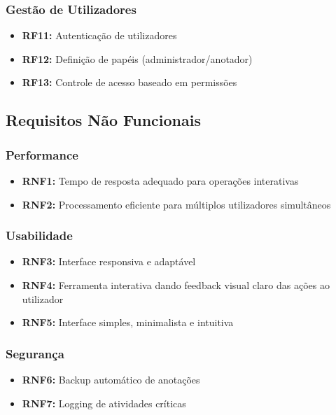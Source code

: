 \subsubsection{Gestão de Utilizadores}

\begin{itemize}
    \item \textbf{RF11:} Autenticação de utilizadores
    \item \textbf{RF12:} Definição de papéis (administrador/anotador)
    \item \textbf{RF13:} Controle de acesso baseado em permissões
\end{itemize}

\subsection{Requisitos Não Funcionais}

\subsubsection{Performance}

\begin{itemize}
    \item \textbf{RNF1:} Tempo de resposta adequado para operações interativas
    \item \textbf{RNF2:} Processamento eficiente para múltiplos utilizadores simultâneos
\end{itemize}

\subsubsection{Usabilidade}

\begin{itemize}
    \item \textbf{RNF3:} Interface responsiva e adaptável
    \item \textbf{RNF4:} Ferramenta interativa dando feedback visual claro das ações ao utilizador
    \item \textbf{RNF5:} Interface simples, minimalista e intuitiva
\end{itemize}

\subsubsection{Segurança}

\begin{itemize}
    \item \textbf{RNF6:} Backup automático de anotações
    \item \textbf{RNF7:} Logging de atividades críticas
\end{itemize}

